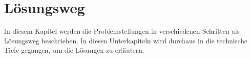 \section{Lösungsweg} \label{sec:projektbericht-loesungsweg}

In diesem Kapitel werden die Problemstellungen in verschiedenen Schritten als Lösungsweg beschrieben.
In diesen Unterkapiteln wird durchaus in die technische Tiefe gegangen, um die Lösungen zu erläutern.






